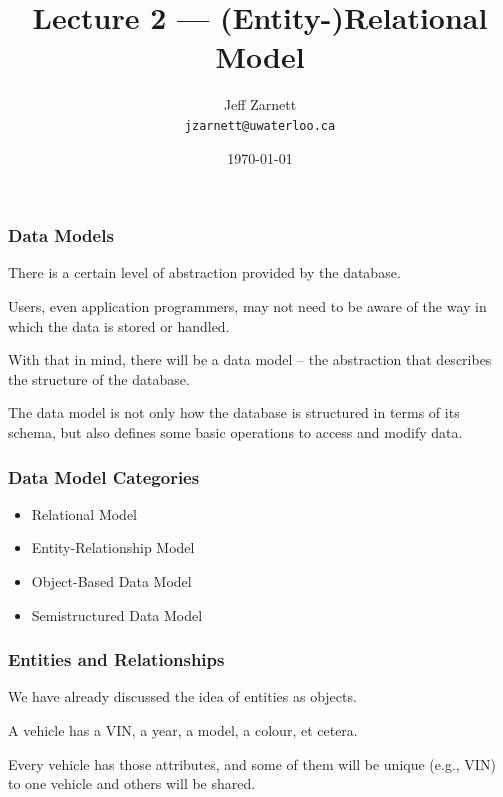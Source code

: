 

\title{Lecture  2 --- (Entity-)Relational Model }

\author{Jeff Zarnett \\ \small \texttt{jzarnett@uwaterloo.ca}}
\date{\today}




\begin{frame}
  \titlepage

 \end{frame}



\begin{frame}
\frametitle{Data Models}

There is a certain level of abstraction provided by the database. 

Users, even application programmers, may not need to be aware of the way in which the data is stored or handled.

 With that in mind, there will be a \alert{data model} -- the abstraction that describes the structure of the database. 
 
 The data model is not only how the database is structured in terms of its schema, but also defines some basic operations to access and modify data.


\end{frame}



\begin{frame}
\frametitle{Data Model Categories}

\begin{itemize}
	\item Relational Model
	\item Entity-Relationship Model
	\item Object-Based Data Model
	\item Semistructured Data Model
\end{itemize}

\end{frame}



\begin{frame}
\frametitle{Entities and Relationships}


We have already discussed the idea of entities as objects. 

A vehicle has a VIN, a year, a model, a colour, et cetera. 

Every vehicle has those attributes, and some of them will be unique (e.g., VIN) to one vehicle and others will be shared.

\end{frame}



